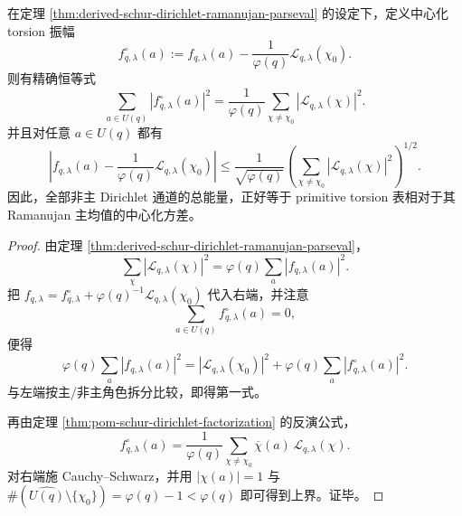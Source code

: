 \begin{corollary}\label{cor:derived-schur-dirichlet-nonprincipal-energy-variance}
在定理 \ref{thm:derived-schur-dirichlet-ramanujan-parseval} 的设定下，定义中心化 torsion 振幅
\[
f_{q,\lambda}^{\circ}(a)
:=
f_{q,\lambda}(a)-\frac{1}{\varphi(q)}\mathcal L_{q,\lambda}(\chi_0).
\]
则有精确恒等式
\[
\sum_{a\in U(q)}|f_{q,\lambda}^{\circ}(a)|^2
=
\frac{1}{\varphi(q)}
\sum_{\chi\neq\chi_0}|\mathcal L_{q,\lambda}(\chi)|^2.
\]
并且对任意 \(a\in U(q)\) 都有
\[
\left|f_{q,\lambda}(a)-\frac{1}{\varphi(q)}\mathcal L_{q,\lambda}(\chi_0)\right|
\le
\frac{1}{\sqrt{\varphi(q)}}
\left(\sum_{\chi\neq\chi_0}|\mathcal L_{q,\lambda}(\chi)|^2\right)^{1/2}.
\]
因此，全部非主 Dirichlet 通道的总能量，正好等于 primitive torsion 表相对于其 Ramanujan 主均值的中心化方差。
\end{corollary}

\begin{proof}
由定理 \ref{thm:derived-schur-dirichlet-ramanujan-parseval}，
\[
\sum_{\chi}|\mathcal L_{q,\lambda}(\chi)|^2
=
\varphi(q)\sum_{a}|f_{q,\lambda}(a)|^2.
\]
把 \(f_{q,\lambda}=f_{q,\lambda}^{\circ}+\varphi(q)^{-1}\mathcal L_{q,\lambda}(\chi_0)\) 代入右端，并注意
\[
\sum_{a\in U(q)}f_{q,\lambda}^{\circ}(a)=0,
\]
便得
\[
\varphi(q)\sum_a |f_{q,\lambda}(a)|^2
=
|\mathcal L_{q,\lambda}(\chi_0)|^2
+
\varphi(q)\sum_a|f_{q,\lambda}^{\circ}(a)|^2.
\]
与左端按主/非主角色拆分比较，即得第一式。

再由定理 \ref{thm:pom-schur-dirichlet-factorization} 的反演公式，
\[
f_{q,\lambda}^{\circ}(a)
=
\frac{1}{\varphi(q)}\sum_{\chi\neq\chi_0}\overline{\chi}(a)\,\mathcal L_{q,\lambda}(\chi).
\]
对右端施 Cauchy--Schwarz，并用 \(|\chi(a)|=1\) 与
\(
\#(\widehat{U(q)}\setminus\{\chi_0\})=\varphi(q)-1<\varphi(q)
\)
即可得到上界。证毕。
\end{proof}

